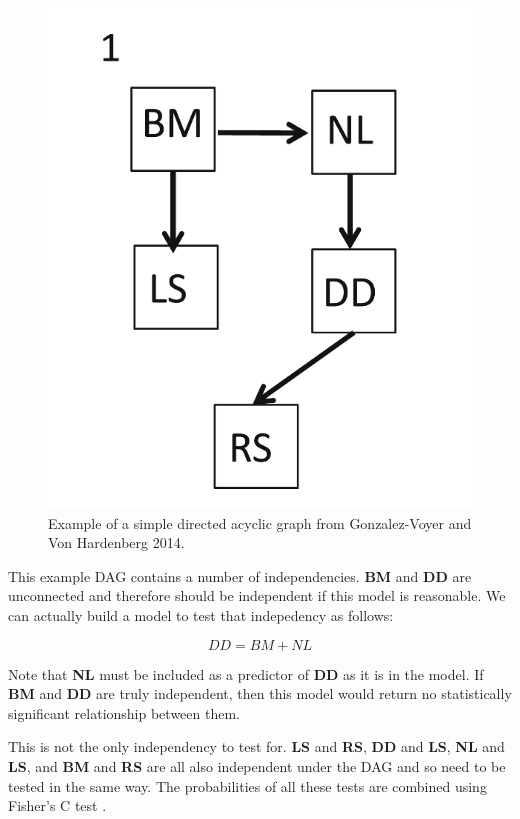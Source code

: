 \documentclass[
]{book}
\begin{document}
\begin{figure}[H]

{\centering \includegraphics[width=7.94in]{Images/DAG1} 

}

\caption{Example of a simple directed acyclic graph from Gonzalez-Voyer and Von Hardenberg 2014.}\label{fig:unnamed-chunk-218}
\end{figure}

This example DAG contains a number of independencies. \textbf{BM} and \textbf{DD} are unconnected and therefore should be independent if this model is reasonable. We can actually build a model to test that indepedency as follows:

\[ DD = BM + NL\]

Note that \textbf{NL} must be included as a predictor of \textbf{DD} as it is in the model. If \textbf{BM} and \textbf{DD} are truly independent, then this model would return no statistically significant relationship between them.

This is not the only independency to test for. \textbf{LS} and \textbf{RS}, \textbf{DD} and \textbf{LS}, \textbf{NL} and \textbf{LS}, and \textbf{BM} and \textbf{RS} are all also independent under the DAG and so need to be tested in the same way. The probabilities of all these tests are combined using Fisher's C test \citep{Shipley16}.
\end{document}
